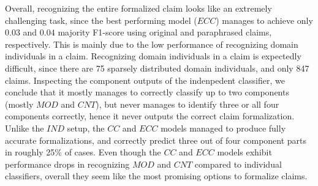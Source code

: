 Overall, recognizing the entire formalized claim looks like an extremely
challenging task, since the best performing model ($ECC$) manages to achieve
only $0.03$ and $0.04$ majority F1-score
using original and paraphrased claims, respectively. This is mainly due
to the low performance of recognizing domain individuals in a claim.
Recognizing domain individuals in a claim is expectedly difficult, since there
are 75 sparsely distributed domain individuals, and only 847 claims.
Inspecting the component outputs of the indenpedent classifier, we conclude
that it mostly manages to correctly classify up to two components (mostly $MOD$
and $CNT$), but never manages to identify three or all four
components correctly, hence it never outputs the correct claim formalization. 
Unlike the $IND$ setup, the $CC$ and $ECC$ models managed to produce fully
accurate formalizations, and correctly predict three out of four component parts
in roughly 25\% of cases.
Even though the $CC$ and $ECC$ models exhibit performance drops in recognizing
$MOD$ and $CNT$ compared to individual classifiers, overall they seem like the most
promising options to formalize claims. 

